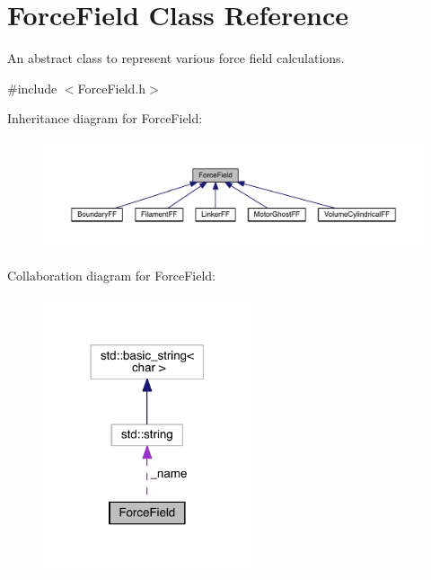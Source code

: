 \hypertarget{classForceField}{\section{Force\+Field Class Reference}
\label{classForceField}
}


An abstract class to represent various force field calculations.  




{\ttfamily \#include $<$Force\+Field.\+h$>$}



Inheritance diagram for Force\+Field\+:\nopagebreak
\begin{figure}[H]
\begin{center}
\leavevmode
\includegraphics[width=350pt]{classForceField__inherit__graph}
\end{center}
\end{figure}


Collaboration diagram for Force\+Field\+:\nopagebreak
\begin{figure}[H]
\begin{center}
\leavevmode
\includegraphics[width=174pt]{classForceField__coll__graph}
\end{center}
\end{figure}
